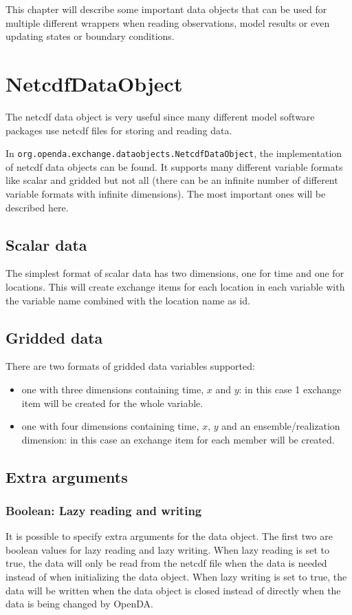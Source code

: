 
This chapter will describe some important data objects that can be used for multiple different wrappers when reading observations, model results or even updating states or boundary conditions.

\section{NetcdfDataObject}

The netcdf data object is very useful since many different model software packages use netcdf files for storing and reading data.

In \verb|org.openda.exchange.dataobjects.NetcdfDataObject|, the \oda implementation of netcdf data objects can be found.
It supports many different variable formats like scalar and gridded but not all (there can be an infinite number of different variable formats with infinite dimensions).
The most important ones will be described here.

\subsection{Scalar data}

The simplest format of scalar data has two dimensions, one for time and one for locations.
This will create exchange items for each location in each variable with the variable name combined with the location name as id.

\subsection{Gridded data}
There are two formats of gridded data variables supported:
\begin{itemize}
\item one with three dimensions containing time, $x$ and $y$: in this case 1 exchange item will be created for the whole variable. 
\item one with four  dimensions containing time, $x$, $y$ and an ensemble/realization dimension: in this case an exchange item for each member will be created.
\end{itemize}

\subsection{Extra arguments}

\subsubsection{Boolean: Lazy reading and writing}
It is possible to specify extra arguments for the data object. The first two are boolean values for lazy reading and lazy writing.
When lazy reading is set to true, the data will only be read from the netcdf file when the data is needed instead of when initializing the data object.
When lazy writing is set to true, the data will be written when the data object is closed instead of directly when the data is being changed by OpenDA.

